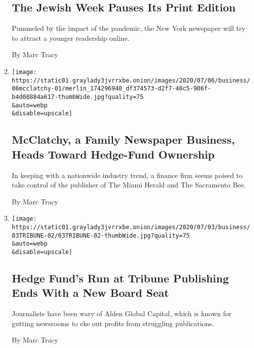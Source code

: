 \begin{enumerate}
{  \subsection{The Jewish Week Pauses Its Print
  Edition}\label{the-jewish-week-pauses-its-print-edition}}

  Pummeled by the impact of the pandemic, the New York newspaper will
  try to attract a younger readership online.

  By Marc Tracy
\item
  \href{/2020/07/06/business/media/mcclatchy-newspapers-hedge-fund.html}{}

  \texttt{[image: https://static01.graylady3jvrrxbe.onion/images/2020/07/06/business/06mcclatchy-01/merlin\_174296940\_df374573-d2f7-40c5-906f-b4d08884a617-thumbWide.jpg?quality=75\\\&auto=webp\\\&disable=upscale]}

  \hypertarget{mcclatchy-a-family-newspaper-business-heads-toward-hedge-fund-ownership}{%
  \subsection{McClatchy, a Family Newspaper Business, Heads Toward
  Hedge-Fund
  Ownership}\label{mcclatchy-a-family-newspaper-business-heads-toward-hedge-fund-ownership}}

  In keeping with a nationwide industry trend, a finance firm seems
  poised to take control of the publisher of The Miami Herald and The
  Sacramento Bee.

  By Marc Tracy
\item
  \href{/2020/07/02/business/media/tribune-alden-board-seat.html}{}

  \texttt{[image: https://static01.graylady3jvrrxbe.onion/images/2020/07/03/business/03TRIBUNE-02/03TRIBUNE-02-thumbWide.jpg?quality=75\\\&auto=webp\\\&disable=upscale]}

  \hypertarget{hedge-funds-run-at-tribune-publishing-ends-with-a-new-board-seat}{%
  \subsection{Hedge Fund's Run at Tribune Publishing Ends With a New
  Board
  Seat}\label{hedge-funds-run-at-tribune-publishing-ends-with-a-new-board-seat}}

  Journalists have been wary of Alden Global Capital, which is known for
  gutting newsrooms to eke out profits from struggling publications.

  By Marc Tracy
\end{enumerate}

